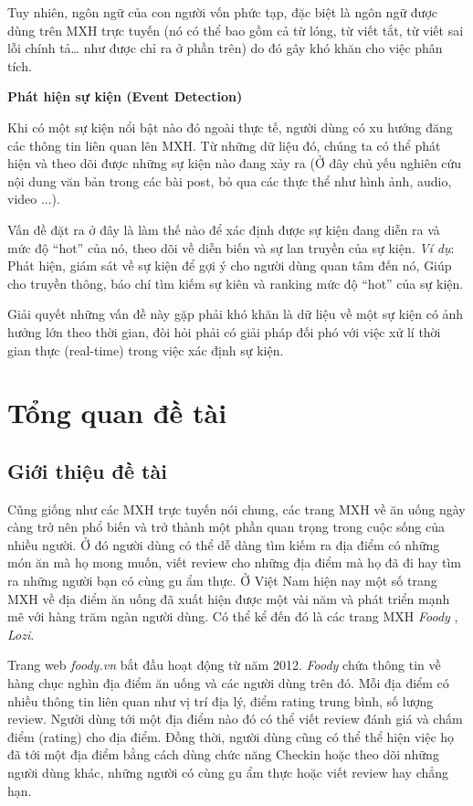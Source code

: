 \documentclass[12pt]{extarticle}
\begin{document}
			\par Tuy nhiên, ngôn ngữ của con người vốn phức tạp, đặc biệt là ngôn ngữ được dùng trên MXH trực tuyến (nó có thể bao gồm cả từ lóng, từ viết tắt, từ viết sai lỗi chính tả… như được chỉ ra ở phần trên) do đó gây khó khăn cho việc phân tích.
			\par \textbf{Phát hiện sự kiện (Event Detection)}
			\par Khi có một sự kiện nổi bật nào đó ngoài thực tế, người dùng có xu hướng đăng các thông tin liên quan lên MXH. Từ những dữ liệu đó, chúng ta có thể phát hiện và theo dõi được những sự kiện nào đang xảy ra (Ở đây chủ yếu nghiên cứu nội dung văn bản trong các bài post, bỏ qua các thực thể như hình ảnh, audio, video ...).
			\par Vấn đề đặt ra ở đây là làm thế nào để xác định được sự kiện đang diễn ra và mức độ “hot” của nó, theo dõi về diễn biến và sự lan truyền của sự kiện. \textit{Ví dụ}: Phát hiện, giám sát về sự kiện để gợi ý cho người dùng quan tâm đến nó, Giúp cho truyền thông, báo chí tìm kiếm sự kiên và ranking mức độ “hot” của sự kiện.
			\par Giải quyết những vấn đề này gặp phải khó khăn là dữ liệu về một sự kiện có ảnh hưởng lớn theo thời gian, đòi hỏi phải có giải pháp đối phó với việc xử lí thời gian thực (real-time) trong việc xác định sự kiện.
	
	\section{Tổng quan đề tài}
		\subsection{Giới thiệu đề tài}
			\par Cũng giống như các MXH trực tuyến nói chung, các trang MXH về ăn uống ngày càng trở nên phổ biến và trở thành một phần quan trọng trong cuộc sống của nhiều người. Ở đó người dùng có thể dễ dàng tìm kiếm ra địa điểm có những món ăn mà họ mong muốn, viết review cho những địa điểm mà họ đã đi hay tìm ra những người bạn có cùng gu ẩm thực. Ở Việt Nam hiện nay một số trang MXH về địa điểm ăn uống đã xuất hiện được một vài năm và phát triển mạnh mẽ với hàng trăm ngàn người dùng. Có thể kể đến đó là các trang MXH \textit{Foody} , \textit{Lozi}.
			\par Trang web \textit{foody.vn} bắt đầu hoạt động từ năm 2012. \textit{Foody}  chứa thông tin về hàng chục nghìn địa điểm ăn uống và các người dùng trên đó. Mỗi địa điểm có nhiều thông tin liên quan như vị trí địa lý, điểm rating trung bình, số lượng review. Người dùng tới một địa điểm nào đó có thể viết review đánh giá và chấm điểm (rating) cho địa điểm. Đồng thời, người dùng cũng có thể thể hiện việc họ đã tới một địa điểm bằng cách dùng chức năng Checkin hoặc theo dõi những người dùng khác, những người có cùng gu ẩm thực hoặc viết review hay chẳng hạn.
\end{document}
